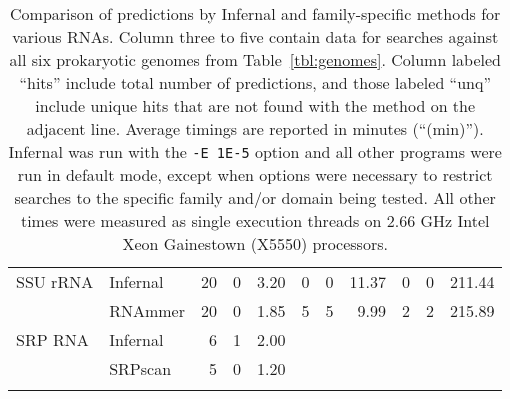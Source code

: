 \begin{small}
\begin{table}
\begin{center}
\begin{tabular}{|l|l|rrr|rrr|rrr|}
SSU rRNA                   &  Infernal                   &   20 &   0 &    3.20 &    0 &   0 &   11.37 &    0 &   0 &  211.44  \\ 
                           &  RNAmmer                    &   20 &   0 &    1.85 &    5 &   5 &    9.99 &    2 &   2 &  215.89  \\ \hline 
SRP RNA                    &  Infernal                   &    6 &   1 &    2.00 &\multicolumn{6}{c}{} \\
                           &  SRPscan                    &    5 &   0 &    1.20 &\multicolumn{6}{c}{} \\ \cline{1-5}
\multicolumn{8}{c}{} \\ 
\end{tabular}
\caption{Comparison of predictions by Infernal and family-specific
  methods for various RNAs. Column three to five contain data for searches
  against all six prokaryotic genomes from Table~\ref{tbl:genomes}.  Column
  labeled ``hits'' include total number of predictions, and those
  labeled ``unq'' include unique hits that are not found with the
  method on the adjacent line. Average timings are reported in minutes
  (``(min)'').  Infernal was run with
  the {\tt -E 1E-5} option and all other programs were run in default
  mode, except when options were necessary to restrict searches to the
  specific family and/or domain being tested. 
  All other times were measured as single execution threads on
  2.66 GHz Intel Xeon Gainestown (X5550) processors.  }
\label{tbl:compare}
\end{center}

\end{table}
\end{small}
